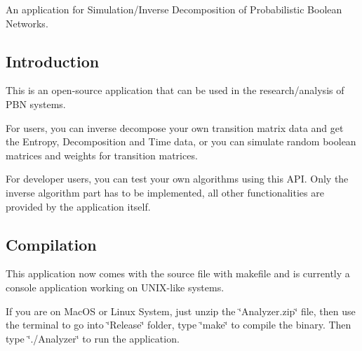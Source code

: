 An application for Simulation/\+Inverse Decomposition of Probabilistic Boolean Networks.\hypertarget{index_Introduction}{}\subsection{Introduction}\label{index_Introduction}
This is an open-\/source application that can be used in the research/analysis of P\+B\+N systems.

For users, you can inverse decompose your own transition matrix data and get the Entropy, Decomposition and Time data, or you can simulate random boolean matrices and weights for transition matrices.

For developer users, you can test your own algorithms using this A\+P\+I. Only the inverse algorithm part has to be implemented, all other functionalities are provided by the application itself.\hypertarget{index_Compilation}{}\subsection{Compilation}\label{index_Compilation}
This application now comes with the source file with makefile and is currently a console application working on U\+N\+I\+X-\/like systems.

If you are on Mac\+O\+S or Linux System, just unzip the \char`\"{}\+Analyzer.\+zip\char`\"{} file, then use the terminal to go into \char`\"{}\+Release\char`\"{} folder, type \char`\"{}make\char`\"{} to compile the binary. Then type \char`\"{}./\+Analyzer\char`\"{} to run the application.

